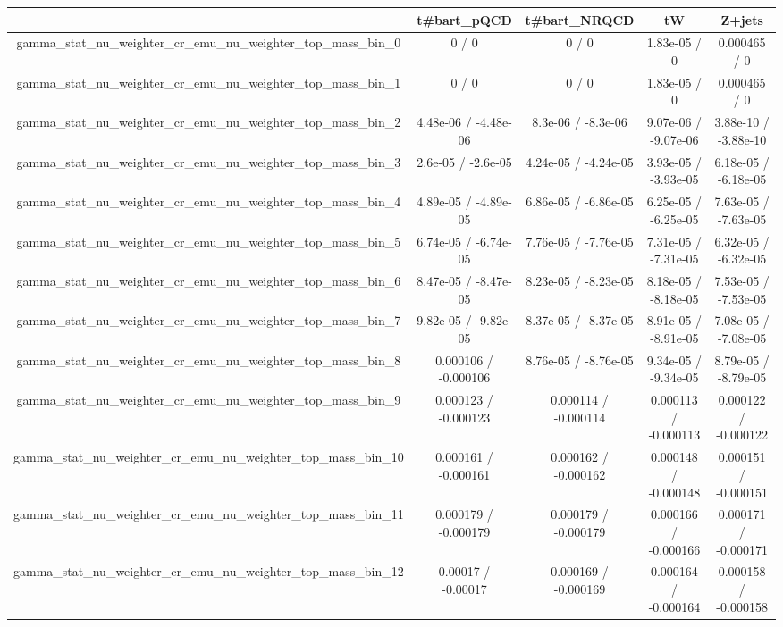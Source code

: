 \documentclass[10pt]{article}
\begin{document}
\begin{table}[htbp]
\begin{center}
\begin{tabular}{|c|c|c|c|c|}
\hline 
      & t#bar{t}_{pQCD}      & t#bar{t}_{NRQCD}      & tW      & Z+jets \\ 
\hline 
  gamma_stat_nu_weighter_cr_emu_nu_weighter_top_mass_bin_0 & 0 / 0 & 0 / 0 & 1.83e-05 / 0 & 0.000465 / 0 \\ 
  gamma_stat_nu_weighter_cr_emu_nu_weighter_top_mass_bin_1 & 0 / 0 & 0 / 0 & 1.83e-05 / 0 & 0.000465 / 0 \\ 
  gamma_stat_nu_weighter_cr_emu_nu_weighter_top_mass_bin_2 & 4.48e-06 / -4.48e-06 & 8.3e-06 / -8.3e-06 & 9.07e-06 / -9.07e-06 & 3.88e-10 / -3.88e-10 \\ 
  gamma_stat_nu_weighter_cr_emu_nu_weighter_top_mass_bin_3 & 2.6e-05 / -2.6e-05 & 4.24e-05 / -4.24e-05 & 3.93e-05 / -3.93e-05 & 6.18e-05 / -6.18e-05 \\ 
  gamma_stat_nu_weighter_cr_emu_nu_weighter_top_mass_bin_4 & 4.89e-05 / -4.89e-05 & 6.86e-05 / -6.86e-05 & 6.25e-05 / -6.25e-05 & 7.63e-05 / -7.63e-05 \\ 
  gamma_stat_nu_weighter_cr_emu_nu_weighter_top_mass_bin_5 & 6.74e-05 / -6.74e-05 & 7.76e-05 / -7.76e-05 & 7.31e-05 / -7.31e-05 & 6.32e-05 / -6.32e-05 \\ 
  gamma_stat_nu_weighter_cr_emu_nu_weighter_top_mass_bin_6 & 8.47e-05 / -8.47e-05 & 8.23e-05 / -8.23e-05 & 8.18e-05 / -8.18e-05 & 7.53e-05 / -7.53e-05 \\ 
  gamma_stat_nu_weighter_cr_emu_nu_weighter_top_mass_bin_7 & 9.82e-05 / -9.82e-05 & 8.37e-05 / -8.37e-05 & 8.91e-05 / -8.91e-05 & 7.08e-05 / -7.08e-05 \\ 
  gamma_stat_nu_weighter_cr_emu_nu_weighter_top_mass_bin_8 & 0.000106 / -0.000106 & 8.76e-05 / -8.76e-05 & 9.34e-05 / -9.34e-05 & 8.79e-05 / -8.79e-05 \\ 
  gamma_stat_nu_weighter_cr_emu_nu_weighter_top_mass_bin_9 & 0.000123 / -0.000123 & 0.000114 / -0.000114 & 0.000113 / -0.000113 & 0.000122 / -0.000122 \\ 
  gamma_stat_nu_weighter_cr_emu_nu_weighter_top_mass_bin_10 & 0.000161 / -0.000161 & 0.000162 / -0.000162 & 0.000148 / -0.000148 & 0.000151 / -0.000151 \\ 
  gamma_stat_nu_weighter_cr_emu_nu_weighter_top_mass_bin_11 & 0.000179 / -0.000179 & 0.000179 / -0.000179 & 0.000166 / -0.000166 & 0.000171 / -0.000171 \\ 
  gamma_stat_nu_weighter_cr_emu_nu_weighter_top_mass_bin_12 & 0.00017 / -0.00017 & 0.000169 / -0.000169 & 0.000164 / -0.000164 & 0.000158 / -0.000158 \\ 

\end{tabular}
\end{center}
\end{table}
\end{document}
